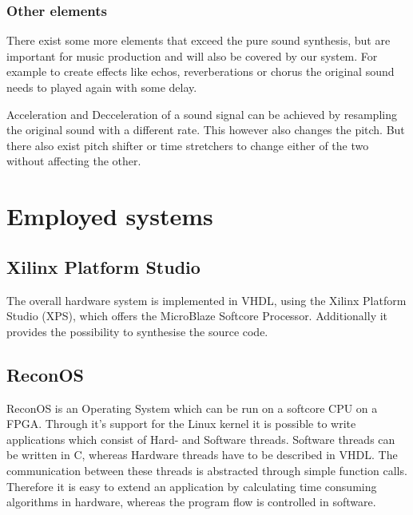 			\subsubsection{Other elements}
				There exist some more elements that exceed the pure sound synthesis, but are important for music production and will also be covered by our system.
				For example to create effects like echos, reverberations or chorus the original sound needs to played again with some delay.
			
				Acceleration and Decceleration of a sound signal can be achieved by resampling the original sound with a different rate. This however also changes the pitch.
				But there also exist pitch shifter or time stretchers to change either of the two without affecting the other.
		
		
		
			
			
			
		
	\section{Employed systems}
	  \subsection{Xilinx Platform Studio}
	    The overall hardware system is implemented in VHDL, using the Xilinx Platform Studio (XPS), which offers the MicroBlaze Softcore Processor. Additionally it provides the possibility to synthesise the source code.
	  
	  \subsection{ReconOS}
		ReconOS is an Operating System which can be run on a softcore CPU on a FPGA. Through it's support for the Linux kernel it is possible to write applications which consist of Hard- and Software threads. Software threads can be written in C, whereas Hardware threads have to be described in VHDL. The communication between these threads is abstracted through simple function calls. Therefore it is easy to extend an application by calculating time consuming algorithms in hardware, whereas the program flow is controlled in software.

